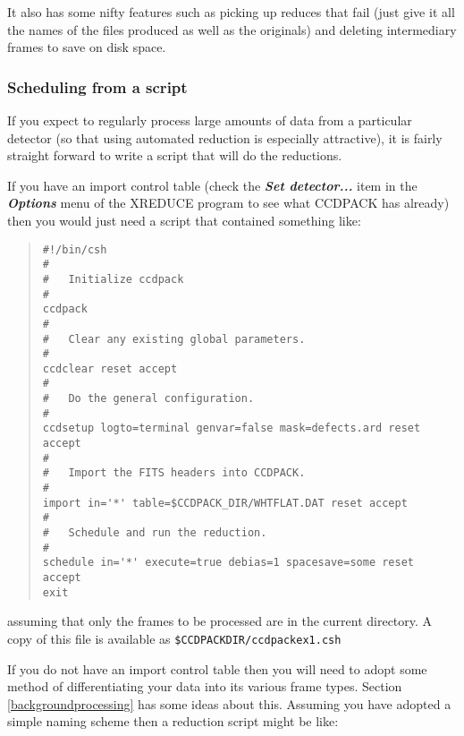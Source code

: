 \documentclass[twoside,11pt]{article}
\newcommand{\htmlref}[2]{#1}
\renewcommand{\_}{\texttt{\symbol{95}}}
\newenvironment{myquote}{\begin{quote}\begin{small}}{\end{small}\end{quote}}
\newcommand{\menu}[1]{{\small \bf \em #1}}
\newcommand{\text}[1]{{\small \tt #1}}
\newcommand{\xroutine}[1]{\htmlref{{\sc #1}}{#1}}
\begin{document}
It also has some nifty features such as picking up reduces that fail
(just give it all the names of the files produced as well as the
originals) and deleting intermediary frames to save on disk space.

\subsubsection{Scheduling from a script}
If you expect to regularly process large amounts of data from
a particular detector (so that using automated reduction is especially
attractive), it is fairly straight forward to write a script that will
do the reductions.

If you have an import control table (check the
\menu{Set detector...} item in the \menu{Options} menu of the
\xroutine{XREDUCE} program to see what CCDPACK has already)
then you would just need a script that contained something like:

\newpage
\begin{center}
\end{center}
\begin{myquote}
\begin{verbatim}
#!/bin/csh
#
#   Initialize ccdpack
#
ccdpack
#
#   Clear any existing global parameters.
#
ccdclear reset accept
#
#   Do the general configuration.
#
ccdsetup logto=terminal genvar=false mask=defects.ard reset accept
#
#   Import the FITS headers into CCDPACK.
#
import in='*' table=$CCDPACK_DIR/WHTFLAT.DAT reset accept
#
#   Schedule and run the reduction.
#
schedule in='*' execute=true debias=1 spacesave=some reset accept
exit
\end{verbatim}
\end{myquote}
assuming that only the frames to be processed are in the current
directory. A copy of this file is available as
\text{\$CCDPACK\_DIR/ccdpack\_ex1.csh}

If you do not have an import control table then you will need to adopt
some method of differentiating your data into its various frame
types. Section \ref{backgroundprocessing} has some ideas about this.
Assuming you have adopted a simple naming scheme then a reduction
script might be like:
\end{document}
